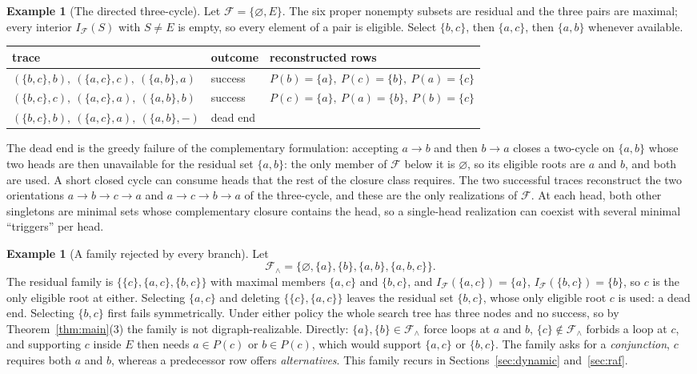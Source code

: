 \documentclass[11pt,a4paper]{article}
\theoremstyle{plain}
\theoremstyle{definition}
\newtheorem{example}[theorem]{Example}
\theoremstyle{remark}
\newcommand{\cF}{\mathcal F}
\newcommand{\Int}{I_{\cF}}
\begin{document}
\begin{example}[The directed three-cycle]\label{ex:cycle}
Let $\cF=\{\varnothing,E\}$. The six proper nonempty subsets are residual and the three pairs are maximal; every interior $\Int(S)$ with $S\neq E$ is empty, so every element of a pair is eligible. Select $\{b,c\}$, then $\{a,c\}$, then $\{a,b\}$ whenever available.
\begin{center}
\small
\begin{tabular}{@{}lll@{}}
\toprule
trace & outcome & reconstructed rows\\
\midrule
$(\{b,c\},b),\ (\{a,c\},c),\ (\{a,b\},a)$ & success & $P(b)=\{a\},\ P(c)=\{b\},\ P(a)=\{c\}$\\
$(\{b,c\},c),\ (\{a,c\},a),\ (\{a,b\},b)$ & success & $P(c)=\{a\},\ P(a)=\{b\},\ P(b)=\{c\}$\\
$(\{b,c\},b),\ (\{a,c\},a),\ (\{a,b\},-)$ & dead end & \\
\bottomrule
\end{tabular}
\end{center}
The dead end is the greedy failure of the complementary formulation: accepting $a\to b$ and then $b\to a$ closes a two-cycle on $\{a,b\}$ whose two heads are then unavailable for the residual set $\{a,b\}$: the only member of $\cF$ below it is $\varnothing$, so its eligible roots are $a$ and $b$, and both are used. A short closed cycle can consume heads that the rest of the closure class requires. The two successful traces reconstruct the two orientations $a\to b\to c\to a$ and $a\to c\to b\to a$ of the three-cycle, and these are the only realizations of $\cF$. At each head, both other singletons are minimal sets whose complementary closure contains the head, so a single-head realization can coexist with several minimal ``triggers'' per head.
\end{example}

\begin{example}[A family rejected by every branch]\label{ex:conj}
Let
\[
 \cF_\wedge=\{\varnothing,\{a\},\{b\},\{a,b\},\{a,b,c\}\}.
\]
The residual family is $\{\{c\},\{a,c\},\{b,c\}\}$ with maximal members $\{a,c\}$ and $\{b,c\}$, and $\Int(\{a,c\})=\{a\}$, $\Int(\{b,c\})=\{b\}$, so $c$ is the only eligible root at either. Selecting $\{a,c\}$ and deleting $\{\{c\},\{a,c\}\}$ leaves the residual set $\{b,c\}$, whose only eligible root $c$ is used: a dead end. Selecting $\{b,c\}$ first fails symmetrically. Under either policy the whole search tree has three nodes and no success, so by Theorem~\ref{thm:main}(3) the family is not digraph-realizable. Directly: $\{a\},\{b\}\in\cF_\wedge$ force loops at $a$ and $b$, $\{c\}\notin\cF_\wedge$ forbids a loop at $c$, and supporting $c$ inside $E$ then needs $a\in P(c)$ or $b\in P(c)$, which would support $\{a,c\}$ or $\{b,c\}$. The family asks for a \emph{conjunction}, $c$ requires both $a$ and $b$, whereas a predecessor row offers \emph{alternatives}. This family recurs in Sections~\ref{sec:dynamic} and~\ref{sec:raf}.
\end{example}
\end{document}
